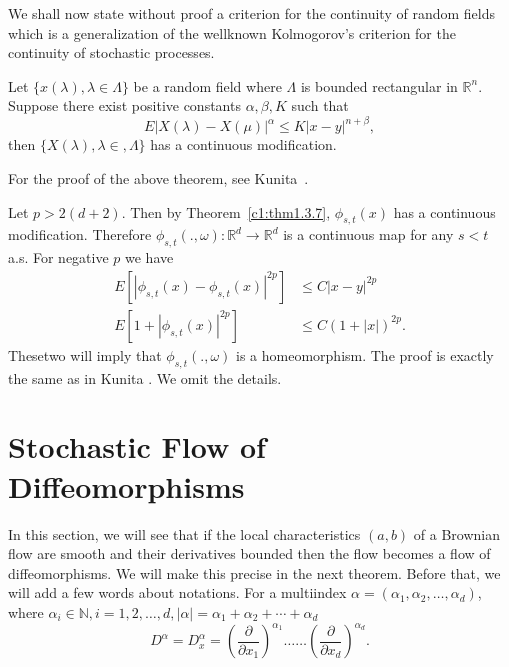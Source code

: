 We shall now state without proof a criterion for the continuity of
random fields which is a generalization of the wellknown Kolmogorov's
criterion for the continuity of stochastic processes. 

\setcounter{theorem}{6}
\begin{theorem}\label{c1:thm1.3.7} %
  Let $\{ x (\lambda), \lambda \in \Lambda\}$ be a random
  field where $\Lambda$ is bounded rectangular in
  $\mathbb{R}^n$. Suppose there exist positive constants $\alpha,
  \beta, K$ such that 
  \begin{equation*}
    E |X(\lambda) - X (\mu)|^\alpha \le 
K |x-y|^{n + \beta}, \tag{1.3.8}\label{c1:eq1.3.8}
  \end{equation*}
  then $\{ X(\lambda), \lambda \in, \Lambda\}$ has a
  continuous modification.  
\end{theorem}

For the proof of the above theorem, see Kunita~\cite{18}.

\setcounter{proofoftheorem}{1}
\begin{proofoftheorem}\label{c1:prfthm1.3.2}%
  Let $p> 2(d+2)$. Then by Theorem~\ref{c1:thm1.3.7}, $\phi_{s,t}{{(x)}}$ has a
  continuous modification. Therefore $\phi_{s,t} (., \omega):
  \mathbb{R}^d \to \mathbb{R}^d$ is a continuous map for any $s < t$
  a.s. For negative $p$ we have  
  \begin{align*}
    E[|\phi_{s,t}{{(x)}} - \phi_{s,t}{{(x)}}|^{2p}] & \le C |x-y|^{2p}\\
    E[1+|\phi_{s,t}{{(x)}}|^{2p}] & \le C (1+|x|)^{2p}. 
  \end{align*}
  These\pageoriginale two will imply that $\phi_{s,t}(., \omega)$ is a
  homeomorphism. The proof is exactly the same as in Kunita \cite{18}. We
  omit the details. 
\end{proofoftheorem}


\section{Stochastic Flow of Diffeomorphisms}\label{chap1:sec1.4}%

In this section, we will see that if the local characteristics $(a,b)$
of a Brownian flow are smooth and their derivatives bounded then the
flow becomes a flow of diffeomorphisms. We will make this precise in
the next theorem. Before that, we will add a few words about
notations. For a multiindex $\alpha= (\alpha_1, \alpha_2, \ldots,
\alpha_d)$, where $\alpha_i \in \mathbb{N},i = 1,2, \ldots, d, 
|\alpha|=\alpha_1+ \alpha_2 + \cdots+ \alpha_d$ 
$$
D^\alpha = D^\alpha_x = (\frac{\partial}{\partial x_1})^{\alpha_1}
\dots \dots (\frac{\partial}{\partial x_d})^{\alpha_d}. 
$$

